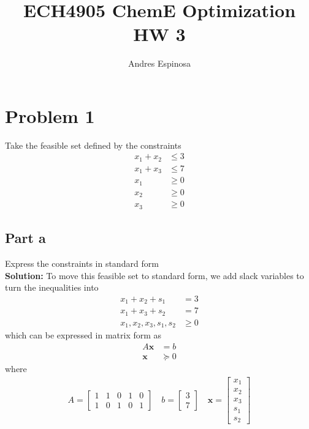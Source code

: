 \documentclass[11pt]{article}
\title{ECH4905 ChemE Optimization HW 3}
\author{Andres Espinosa}
\begin{document}
\maketitle

\section{Problem 1}
Take the feasible set defined by the constraints
\[
\begin{aligned}
x_1 + x_2 &\leq 3 \\
x_1 + x_3 &\leq 7 \\
x_1 &\geq 0 \\
x_2 &\geq 0 \\
x_3 &\geq 0
\end{aligned}
\]

\subsection{Part a}
Express the constraints in standard form
\\
\textbf{Solution: }
To move this feasible set to standard form, we add slack variables to turn the inequalities into 
\[
\begin{aligned}
x_1 + x_2 + s_1 & = 3 \\
x_1 + x_3 + s_2 & = 7 \\
x_1, x_2, x_3, s_1, s_2 & \geq 0
\end{aligned}
\]
which can be expressed in matrix form as 
\[
\begin{aligned}
A \textbf{x}& = b \\
\textbf{x} &\succeq 0
\end{aligned}
\]
where
\begin{align*}
    A =
  \begin{bmatrix}
     1 & 1 & 0 & 1 & 0 \\
     1 & 0 & 1 & 0 & 1
  \end{bmatrix}
  \quad
  b = 
  \begin{bmatrix}
    3 \\ 7
  \end{bmatrix}
  \quad
  \textbf{x} = 
  \begin{bmatrix}
    x_1 \\ x_2 \\ x_3 \\ s_1 \\ s_2
  \end{bmatrix}
\end{align*}
\end{document}
